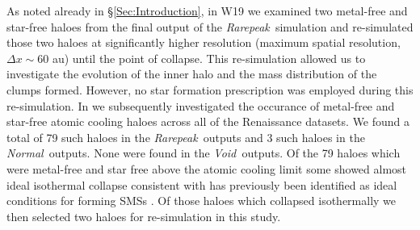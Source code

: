 \documentclass[graphics, twocolumn, usenatbib]{mn2e}
\newcommand{\rarepeak} {\textit{Rarepeak~}}
\newcommand{\normal} {\textit{Normal~}}
\newcommand{\void} {\textit{Void~}}
\begin{document}
 As noted already in \S \ref{Sec:Introduction}, in W19 we examined two metal-free and star-free
 haloes from the final output of the \rarepeak simulation and re-simulated those two haloes at
 significantly higher resolution (maximum spatial resolution, $\Delta x \sim 60$ au) until the
 point of collapse. This re-simulation allowed us to investigate the evolution of the inner halo
 and the mass distribution of the clumps formed. However, no star formation prescription was
 employed during this re-simulation. In \cite{Regan_2019} we subsequently investigated the occurance
 of metal-free and star-free atomic cooling haloes across all of the Renaissance datasets. We found
 a total of 79 such haloes in the
 \rarepeak outputs and 3 such haloes in the \normal outputs. None were found in the \void outputs.
 Of the 79 haloes which were metal-free and star free above the atomic cooling limit some
 showed almost ideal isothermal collapse consistent with has previously been identified
 as ideal conditions for forming SMSs \citep{Inayoshi_2014, Becerra_2015, Latif_2016a,
   Regan_2017, Chon_2017b, Regan_2018b}. Of those haloes which collapsed isothermally we then
 selected two haloes for re-simulation in this study. \\
\end{document}
